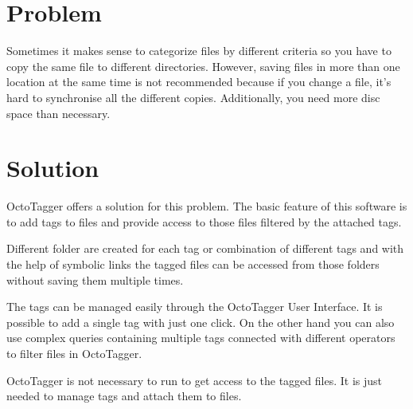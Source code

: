\section{Problem}
\def\kapitelautor{Julian Lorenz}

Sometimes it makes sense to categorize files by different criteria so you have to copy the same file to different directories. However, saving files in more than one location at the same time is not recommended because if you change a file, it's hard to synchronise all the different copies.  Additionally, you need more disc space than necessary.

\section{Solution}
\def\kapitelautor{Julian Lorenz}

OctoTagger offers a solution for this problem. The basic feature of this software is to add tags to files and provide access to those files filtered by the attached tags. 

Different folder are created for each tag or combination of different tags and with the help of symbolic links the tagged files can be accessed from those folders without saving them multiple times.

The tags can be managed easily through the OctoTagger User Interface. It is possible to add a single tag with just one click. On the other hand you can also use complex queries containing multiple tags connected with different operators to filter files in OctoTagger. 

OctoTagger is not necessary to run to get access to the tagged files. It is just needed to manage tags and attach them to files.


